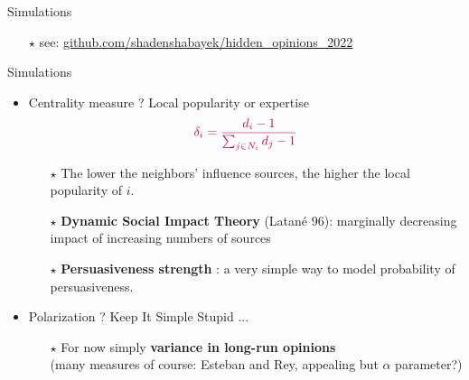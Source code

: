 \documentclass[xcolor=table,handout]{beamer}
\begin{document}
\begin{frame}
\begin{tcolorbox}[enhanced,attach boxed title to top center={yshift=-3mm,yshifttext=-1mm}, colback=red!3,colframe=red!40,colbacktitle=red!40 ,fonttitle=\bfseries, boxed title style={size=small,colframe=red!50} ] 
\centering Simulations
\end{tcolorbox}
\begin{itemize}
\item[$\star$] {\color{gray}\small see: \href{https://github.com/shadenshabayek/hidden_opinions_2022}{github.com/shadenshabayek/hidden\_opinions\_2022}}
\end{itemize}
\end{frame}

\begin{frame}{Simulations}
\begin{itemize} 
\item Centrality measure ?  Local popularity or expertise    $${\color{purple}\delta_i= \frac{d_i -1}{\sum_{j \in N_i} d_j -1}}$$ \begin{itemize} \setlength\itemsep{1em}
	\item[$\star$] The lower the neighbors' influence sources, the higher the local popularity of $i$. 
	\item[$\star$] {\bf\color{purple}Dynamic Social Impact Theory} (Latan\'{e} 96): marginally decreasing impact of increasing numbers of sources
	\item[$\star$] {\bf\color{purple}Persuasiveness strength} : a very simple way to model probability of persuasiveness. 
\end{itemize} 
\item Polarization ? Keep It Simple Stupid ...  
\begin{itemize} 
	\item[$\star$] For now simply {\bf \color{purple} variance in long-run opinions} \\ {\color{gray}(many measures of course: Esteban and Rey, appealing but $\alpha$ parameter?)}
	\end{itemize}
\end{itemize}
\end{frame}
%
\end{document}

